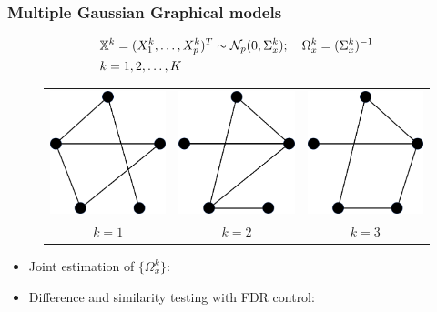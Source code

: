 \documentclass[10pt]{beamer}
\theoremstyle{definition}
\begin{document}
\begin{frame}
\frametitle{Multiple Gaussian Graphical models}

\begin{align*}
& {\mathbb{X}}^k = (X_1^k, \ldots, X_p^k)^T \sim {\cal{N}}_p (0, \Sigma_x^k); \quad
\Omega_x^k = (\Sigma_x^k)^{-1}\\
& k = 1, 2, \ldots, K
\end{align*}

\begin{figure}
\centering
\begin{tabular}{ccc}
\includegraphics[width=.25\textwidth]{formulation_2} & \includegraphics[width=.25\textwidth]{formulation_3}
& \includegraphics[width=.25\textwidth]{formulation_4}
\\
$k=1$ & $k=2$ & $k=3$
\end{tabular}
\hspace{1em}
\end{figure}
\vspace{1em}

\begin{itemize}
\item Joint estimation of $\{ \Omega_x^k \}$: {\colr \cite{GuoEtal11, MaMichailidis15}}
\vspace{1em}

\item Difference and similarity testing with FDR control: {\colr\cite{Liu17}}
\end{itemize}
\end{frame}
\end{document}
